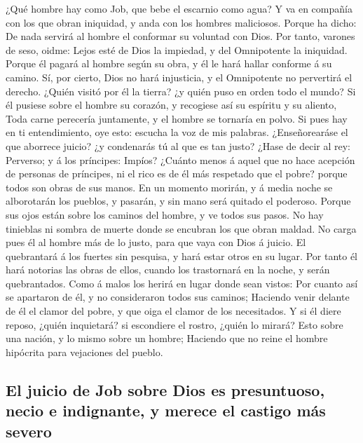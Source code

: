  ¿Qué hombre hay como Job, que bebe el escarnio como agua?
 Y va en compañía con los que obran iniquidad, y anda con
los hombres maliciosos.  Porque ha dicho: De nada servirá al
hombre el conformar su voluntad con Dios.  Por tanto,
varones de seso, oidme: Lejos esté de Dios la impiedad, y del
Omnipotente la iniquidad.  Porque él pagará al hombre según
su obra, y él le hará hallar conforme á su camino.  Sí, por
cierto, Dios no hará injusticia, y el Omnipotente no pervertirá el
derecho.  ¿Quién visitó por él la tierra? ¿y quién puso en
orden todo el mundo?  Si él pusiese sobre el hombre su
corazón, y recogiese así su espíritu y su aliento,  Toda
carne perecería juntamente, y el hombre se tornaría en polvo.
 Si pues hay en ti entendimiento, oye esto: escucha la voz
de mis palabras.  ¿Enseñorearáse el que aborrece juicio? ¿y
condenarás tú al que es tan justo?  ¿Hase de decir al rey:
Perverso; y á los príncipes: Impíos?  ¿Cuánto menos á aquel
que no hace acepción de personas de príncipes, ni el rico es de él más
respetado que el pobre? porque todos son obras de sus manos.
 En un momento morirán, y á media noche se alborotarán los
pueblos, y pasarán, y sin mano será quitado el poderoso. 
Porque sus ojos están sobre los caminos del hombre, y ve todos sus
pasos.  No hay tinieblas ni sombra de muerte donde se
encubran los que obran maldad.  No carga pues él al hombre
más de lo justo, para que vaya con Dios á juicio.  El
quebrantará á los fuertes sin pesquisa, y hará estar otros en su lugar.
 Por tanto él hará notorias las obras de ellos, cuando los
trastornará en la noche, y serán quebrantados.  Como á
malos los herirá en lugar donde sean vistos:  Por cuanto
así se apartaron de él, y no consideraron todos sus caminos;
 Haciendo venir delante de él el clamor del pobre, y que
oiga el clamor de los necesitados.  Y si él diere reposo,
¿quién inquietará? si escondiere el rostro, ¿quién lo mirará? Esto sobre
una nación, y lo mismo sobre un hombre;  Haciendo que no
reine el hombre hipócrita para vejaciones del pueblo.

\hypertarget{el-juicio-de-job-sobre-dios-es-presuntuoso-necio-e-indignante-y-merece-el-castigo-muxe1s-severo}{%
\subsection{El juicio de Job sobre Dios es presuntuoso, necio e
indignante, y merece el castigo más
severo}\label{el-juicio-de-job-sobre-dios-es-presuntuoso-necio-e-indignante-y-merece-el-castigo-muxe1s-severo}}

